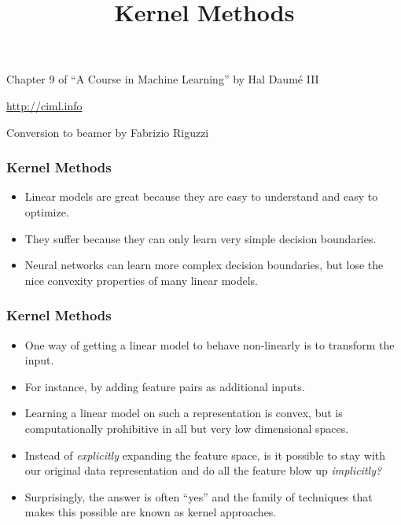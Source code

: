 \documentclass[trans]{beamer}
\title[Kernel Methods]
{Kernel Methods}
\institute[] %
{
}
\date{}
\newcommand{\myalert}[1]{{%
 #1}}
\begin{document}
\begin{frame}
\titlepage 
\vspace{-2cm}
\begin{center}
Chapter 9 of ``A Course in  Machine Learning'' by Hal Daum\'e III

\url{http://ciml.info}

Conversion to beamer by Fabrizio Riguzzi
\end{center}

\end{frame}
  \renewcommand{\concept}[1]{\myalert{#1}}
  \renewcommand{\koncept}[2]{\myalert{#1}}

\renewcommand{\Figure}[3]{%
    \begin{center}
    \texttt{[image: ../book/figs/\#1]}
    \end{center}
  }
  
\begin{frame}
  \frametitle{Kernel Methods}
\begin{itemize}
\item Linear models are great because they are easy to
understand and easy to optimize.
\item  They suffer because they can only
learn very simple decision boundaries.
\item  Neural networks can learn more
complex decision boundaries, but lose the nice convexity properties of
many linear models.
\end{itemize}
\end{frame}
\begin{frame}
  \frametitle{Kernel Methods}
\begin{itemize}
\item 
One way of getting a linear model to behave non-linearly is to
transform the input. 
\item For instance, by adding feature pairs as
additional inputs. 
\item Learning a linear model on such a representation
is convex, but is computationally prohibitive in all but very low
dimensional spaces. 
\item Instead of \emph{explicitly}
expanding the feature space, is it possible to stay with our original
data representation and do all the feature blow up \emph{implicitly?}
\item 
Surprisingly, the answer is often ``yes'' and the family of techniques
that makes this possible are known as \concept{kernel} approaches.
\end{itemize}
\end{frame}
\end{document}
